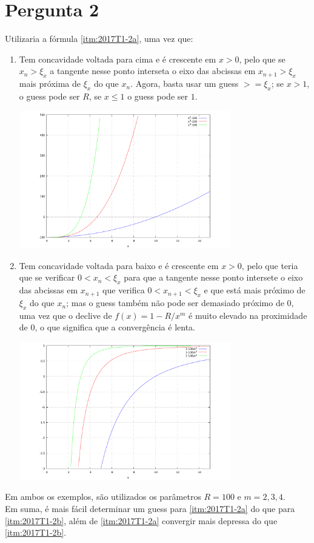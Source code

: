 \section{Pergunta 2}
Utilizaria a fórmula \ref{itm:2017T1-2a}, uma vez que:
\begin{enumerate}[label=\textbf{(\alph*)}]
	\item \label{itm:2017T1-2a} Tem concavidade voltada para cima e é crescente em $x > 0$, pelo que se $x_n > \xi_x$ a tangente nesse ponto interseta o eixo das abcissas em $x_{n+1} >\xi_x $ mais próxima de $\xi_x$ do que $x_n$. Agora, basta usar um guess $>= \xi_x$; se $x>1$, o guess pode ser $R$, se $x\leq1$ o guess pode ser $1$.
	\begin{center} \includegraphics[height=60mm,keepaspectratio]{plot2017T1-2a} \end{center}
	\item \label{itm:2017T1-2b} Tem concavidade voltada para baixo e é crescente em $x > 0$, pelo que teria que se verificar $0 < x_n < \xi_x$ para que a tangente nesse ponto intersete o eixo das abcissas em $x_{n+1}$ que verifica $0<x_{n+1}<\xi_x$ e que está mais próximo de $\xi_x$ do que $x_n$; mas o guess também não pode ser demasiado próximo de $0$, uma vez que o declive de $f(x)=1-R/x^m$ é muito elevado na proximidade de $0$, o que significa que a convergência é lenta.
	\begin{center} \includegraphics[height=60mm,keepaspectratio]{plot2017T1-2b} \end{center}
\end{enumerate}
Em ambos os exemplos, são utilizados os parâmetros $R=100$ e $m=2,3,4$.\\
Em suma, é mais fácil determinar um guess para \ref{itm:2017T1-2a} do que para \ref{itm:2017T1-2b}, além de \ref{itm:2017T1-2a} convergir mais depressa do que \ref{itm:2017T1-2b}.

